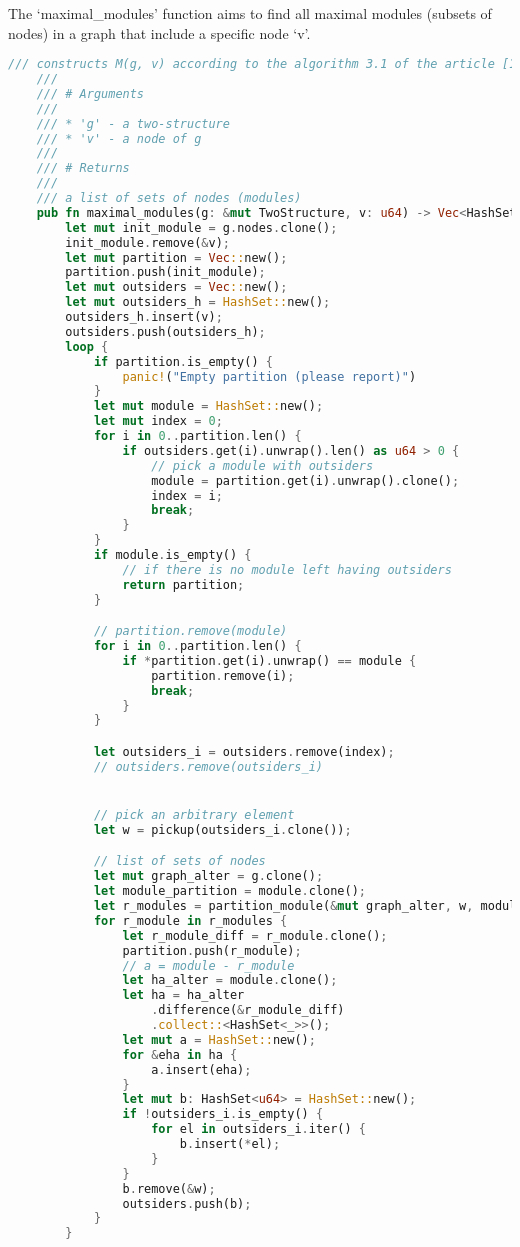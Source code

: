 The `maximal\_modules' function aims to find all maximal modules (subsets of nodes) in a graph that include a specific node `v'.

\begin{lstlisting}[language=Rust, style=rust, caption={Defining the maximal modules}, label={lst:rust-define-maximal-modules}, firstnumber=1]
    /// constructs M(g, v) according to the algorithm 3.1 of the article [1]
    ///
    /// # Arguments
    ///
    /// * 'g' - a two-structure
    /// * 'v' - a node of g
    ///
    /// # Returns
    ///
    /// a list of sets of nodes (modules)
    pub fn maximal_modules(g: &mut TwoStructure, v: u64) -> Vec<HashSet<u64>> {
        let mut init_module = g.nodes.clone();
        init_module.remove(&v);
        let mut partition = Vec::new();
        partition.push(init_module);
        let mut outsiders = Vec::new();
        let mut outsiders_h = HashSet::new();
        outsiders_h.insert(v);
        outsiders.push(outsiders_h);
        loop {
            if partition.is_empty() {
                panic!("Empty partition (please report)")
            }
            let mut module = HashSet::new();
            let mut index = 0;
            for i in 0..partition.len() {
                if outsiders.get(i).unwrap().len() as u64 > 0 {
                    // pick a module with outsiders
                    module = partition.get(i).unwrap().clone();
                    index = i;
                    break;
                }
            }
            if module.is_empty() {
                // if there is no module left having outsiders
                return partition;
            }

            // partition.remove(module)
            for i in 0..partition.len() {
                if *partition.get(i).unwrap() == module {
                    partition.remove(i);
                    break;
                }
            }

            let outsiders_i = outsiders.remove(index);
            // outsiders.remove(outsiders_i)


            // pick an arbitrary element
            let w = pickup(outsiders_i.clone());

            // list of sets of nodes
            let mut graph_alter = g.clone();
            let module_partition = module.clone();
            let r_modules = partition_module(&mut graph_alter, w, module_partition);
            for r_module in r_modules {
                let r_module_diff = r_module.clone();
                partition.push(r_module);
                // a = module - r_module
                let ha_alter = module.clone();
                let ha = ha_alter
                    .difference(&r_module_diff)
                    .collect::<HashSet<_>>();
                let mut a = HashSet::new();
                for &eha in ha {
                    a.insert(eha);
                }
                let mut b: HashSet<u64> = HashSet::new();
                if !outsiders_i.is_empty() {
                    for el in outsiders_i.iter() {
                        b.insert(*el);
                    }
                }
                b.remove(&w);
                outsiders.push(b);
            }
        }


\end{lstlisting}
